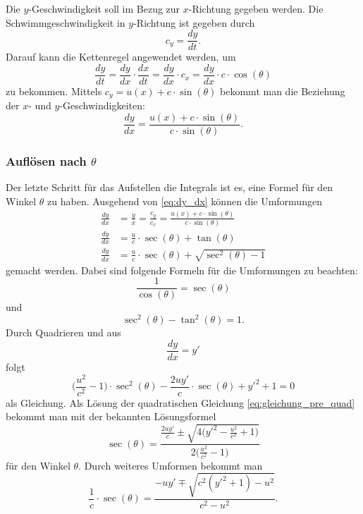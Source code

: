 Die \(y\)-Geschwindigkeit soll im Bezug zur \(x\)-Richtung gegeben
werden. Die Schwimmgeschwindigkeit in \(y\)-Richtung ist gegeben
durch
\begin{equation*}
    c_y = \frac{dy}{dt}.
\end{equation*}
Darauf kann die Kettenregel angewendet werden, um
\begin{equation*}
    \frac{dy}{dt} = \frac{dy}{dx} \cdot \frac{dx}{dt} = \frac{dy}{dx}\cdot c_x = \frac{dy}{dx}\cdot c\cdot \cos(\theta)
\end{equation*}
zu bekommen. Mittels \(c_y = u(x) + c\cdot \sin(\theta)\) bekommt man die Beziehung der \(x\)- und \(y\)-Geschwindigkeiten:
\begin{equation}
\frac{dy}{dx}
=
\frac{u(x) + c \cdot \sin(\theta)}{c \cdot \sin(\theta)}.
\label{eq:dy_dx}
\end{equation}



\subsubsection{Auflösen nach \(\theta\)}

Der letzte Schritt für das Aufstellen die Integrals ist es, eine
Formel für den Winkel \(\theta\) zu haben.
Ausgehend von \eqref{eq:dy_dx} können die Umformungen  
\begin{align*}
    \frac{dy}{dx} &= \frac{\dot{y}}{\dot{x}} = \frac{c_y}{c_x} = \frac{u(x) + c \cdot \sin(\theta)}{c \cdot \sin(\theta)} \\
    \frac{dy}{dx} &= \frac{u}{c}\cdot \sec(\theta) + \tan(\theta) \\
    \frac{dy}{dx} &= \frac{u}{c}\cdot \sec(\theta) + \sqrt{\sec^2(\theta)-1}
\end{align*}
gemacht werden. Dabei sind folgende Formeln für die Umformungen zu
beachten: \[\frac{1}{\cos(\theta)} = \sec(\theta)\] und
\[
\sec^2(\theta)-\tan^2(\theta) = 1.
\]
Durch Quadrieren und aus
\[
\frac{dy}{dx} = y'
\]
folgt
\begin{equation}
    \biggl(\frac{u^2}{c^2}-1 \biggr) \cdot \sec^2(\theta) - \frac{2uy'}{c}\cdot \sec(\theta) + y'^2 +1 = 0
\label{eq:gleichung_pre_quad}
\end{equation}
als Gleichung. Als Lösung der quadratischen Gleichung
\eqref{eq:gleichung_pre_quad} bekommt man mit der bekannten
Lösungsformel
\begin{equation*}
    \sec(\theta)
    =
    \frac{
		\displaystyle
		\frac{2uy'}{c} \pm \sqrt{4\biggl(y'^2-\frac{u^2}{c^2} + 1\biggr)}
	}{
		\displaystyle
		2\biggl(\frac{u^2}{c^2}-1\biggr)
	}
\end{equation*}
für den Winkel \(\theta\). Durch weiteres Umformen bekommt man
\begin{equation}
    \frac{1}{c}\cdot \sec(\theta) = \frac{-uy' \mp \sqrt{c^2(y'^2+1)-u^2}}{c^2-u^2} .
\label{eq:theta_1}
\end{equation}


